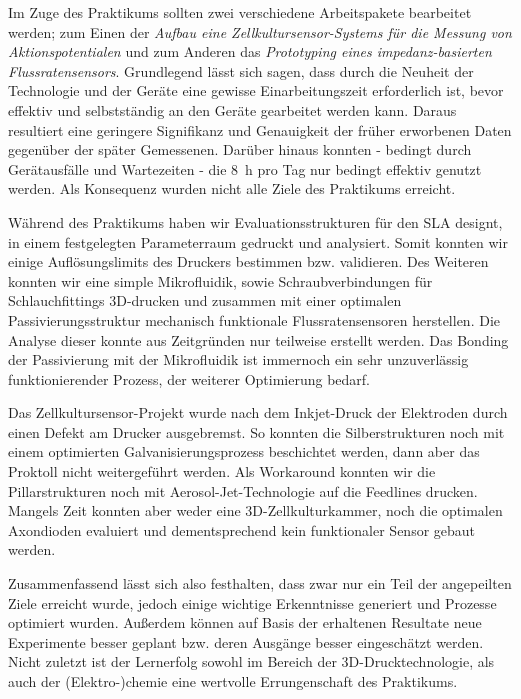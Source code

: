 Im Zuge des Praktikums sollten zwei verschiedene Arbeitspakete bearbeitet werden; zum Einen der \textit{Aufbau eine Zellkultursensor-Systems für die Messung von Aktionspotentialen} und zum Anderen das \textit{Prototyping eines impedanz-basierten Flussratensensors}. Grundlegend lässt sich sagen, dass durch die Neuheit der Technologie und der Geräte eine gewisse Einarbeitungszeit erforderlich ist, bevor effektiv und selbstständig an den Geräte gearbeitet werden kann. Daraus resultiert eine geringere Signifikanz und Genauigkeit der früher erworbenen Daten gegenüber der später Gemessenen. 
Darüber hinaus konnten - bedingt durch Gerätausfälle und Wartezeiten - die \SI{8}{\hour} pro Tag nur bedingt effektiv genutzt werden. Als Konsequenz wurden nicht alle Ziele des Praktikums erreicht. 

Während des Praktikums haben wir Evaluationsstrukturen für den SLA designt, in einem festgelegten Parameterraum gedruckt und analysiert. Somit konnten wir einige Auflösungslimits des Druckers bestimmen bzw. validieren. Des Weiteren konnten wir eine simple Mikrofluidik, sowie Schraubverbindungen für Schlauchfittings 3D-drucken und zusammen mit einer optimalen Passivierungsstruktur mechanisch funktionale Flussratensensoren herstellen. Die Analyse dieser konnte aus Zeitgründen nur teilweise erstellt werden. Das Bonding der Passivierung mit der Mikrofluidik ist immernoch ein sehr unzuverlässig funktionierender Prozess, der weiterer Optimierung bedarf.

Das Zellkultursensor-Projekt wurde nach dem Inkjet-Druck der Elektroden durch einen Defekt am Drucker ausgebremst. So konnten die Silberstrukturen noch mit einem optimierten Galvanisierungsprozess beschichtet werden, dann aber das Proktoll nicht weitergeführt werden. Als Workaround konnten wir die Pillarstrukturen noch mit Aerosol-Jet-Technologie auf die Feedlines drucken. Mangels Zeit konnten aber weder eine 3D-Zellkulturkammer, noch die optimalen Axondioden evaluiert und dementsprechend kein funktionaler Sensor gebaut werden.

Zusammenfassend lässt sich also festhalten, dass zwar nur ein Teil der angepeilten Ziele erreicht wurde, jedoch einige wichtige Erkenntnisse generiert und Prozesse optimiert wurden. Außerdem können auf Basis der erhaltenen Resultate neue Experimente besser geplant bzw. deren Ausgänge besser eingeschätzt werden. Nicht zuletzt ist der Lernerfolg sowohl im Bereich der 3D-Drucktechnologie, als auch der (Elektro-)chemie eine wertvolle Errungenschaft des Praktikums.